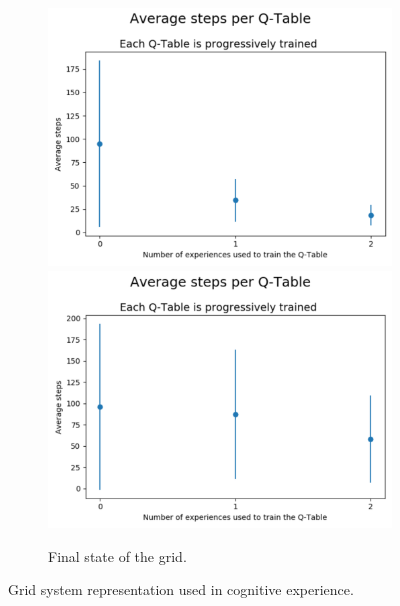 \documentclass[journal]{IEEEtran}
\begin{document}
\begin{figure}[h!]
\begin{subfigure}{0.5\textwidth}
  \includegraphics[scale=0.2]{Images/Average_steps/nati.png} 
  \includegraphics[scale=0.2]{Images/Average_steps/santiago.png} 
\caption{Final state of the grid.}
\label{fig:subim2}
\end{subfigure}
\caption{Grid system representation used in cognitive experience.}
\label{fig:game_representation}
\end{figure}
\end{document}
